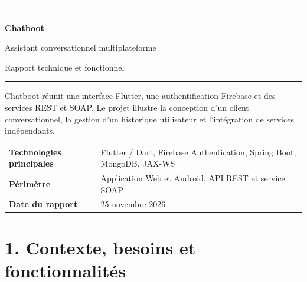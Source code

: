 \documentclass[10pt,a4paper]{article}
\begin{document}
\begin{titlepage}
\thispagestyle{empty}
\pagecolor{paper}
\vspace*{1.4cm}
\noindent\colorbox{forest}{\parbox{\dimexpr\textwidth-2\fboxsep\relax}{%
  \vspace{0.35cm}\hspace{0.25cm}\textcolor{white}{\large\textbf{PROJET FLUTTER \;|\; ARCHITECTURE SOA}}
  \vspace{0.35cm}}}

\vspace{2.1cm}
{\Huge\bfseries\color{ink} Chatboot\par}
\vspace{0.35cm}
{\LARGE\color{forest} Assistant conversationnel multiplateforme\par}
\vspace{0.8cm}
{\large\color{muted} Rapport technique et fonctionnel\par}

\vspace{1.8cm}
\color{orange}\rule{0.22\textwidth}{3pt}
\vspace{0.65cm}

\begin{minipage}{0.82\textwidth}
\large
Chatboot réunit une interface Flutter, une authentification Firebase et des services REST et SOAP. Le projet illustre la conception d'un client conversationnel, la gestion d'un historique utilisateur et l'intégration de services indépendants.
\end{minipage}

\vfill
\begin{tabularx}{\textwidth}{@{}p{4.3cm}X@{}}
\textbf{Technologies principales} & Flutter / Dart, Firebase Authentication, Spring Boot, MongoDB, JAX-WS \\
\textbf{Périmètre} & Application Web et Android, API REST et service SOAP \\
\textbf{Date du rapport} & 25 novembre 2026 \\
\end{tabularx}
\vspace{1.1cm}
\pagecolor{white}
\end{titlepage}

\setcounter{page}{2}
\small
\section*{1. Contexte, besoins et fonctionnalités}
\end{document}
